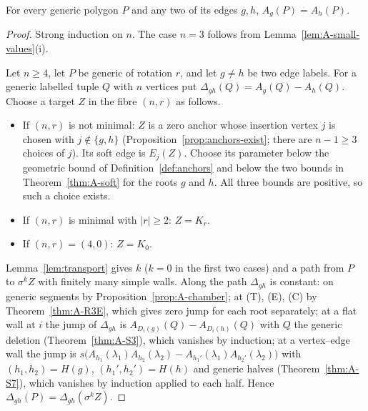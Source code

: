 \begin{theorem}\label{thm:root-indep-proof}\leanok
For every generic polygon $P$ and any two of its edges $g,h$, $A_g(P)=A_h(P)$.

\end{theorem}
\begin{proof}\leanok{}
Strong induction on $n$. The case $n=3$ follows from
Lemma~\ref{lem:A-small-values}(i).

Let $n\geq4$, let $P$ be generic of rotation $r$, and let $g\neq h$ be two
edge labels. For a generic labelled tuple $Q$ with $n$ vertices put
$\Delta_{gh}(Q)=A_g(Q)-A_h(Q)$. Choose a target $Z$ in the fibre $(n,r)$ as
follows.
\begin{itemize}
\item If $(n,r)$ is not minimal: $Z$ is a zero anchor whose insertion vertex
$j$ is chosen with $j\notin\{g,h\}$ (Proposition~\ref{prop:anchors-exist};
there are $n-1\geq3$ choices of $j$). Its soft edge is $E_j(Z)$.
Choose its parameter below the geometric bound of
Definition~\ref{def:anchors} and below the two bounds in
Theorem~\ref{thm:A-soft} for the roots $g$ and $h$.
All three bounds are positive, so such a choice exists.
\item If $(n,r)$ is minimal with $|r|\geq2$: $Z=K_r$.
\item If $(n,r)=(4,0)$: $Z=K_0$.
\end{itemize}
Lemma~\ref{lem:transport} gives $k$ ($k=0$ in the first two cases) and a path
from $P$ to $\sigma^kZ$ with finitely many simple walls. Along the path
$\Delta_{gh}$ is constant: on generic segments by
Proposition~\ref{prop:A-chamber}; at (T), (E), (C) by
Theorem~\ref{thm:A-R3E}, which gives zero jump for each root separately; at a
flat wall at $i$ the jump of $\Delta_{gh}$ is
$A_{D_i(g)}(Q)-A_{D_i(h)}(Q)$ with $Q$ the generic deletion
(Theorem~\ref{thm:A-S3}), which vanishes by induction; at a vertex--edge wall
the jump is
$s\bigl(A_{h_1}(\lambda_1)A_{h_2}(\lambda_2)-A_{h_1'}(\lambda_1)A_{h_2'}(\lambda_2)\bigr)$
with $(h_1,h_2)=H(g)$, $(h_1',h_2')=H(h)$ and generic halves
(Theorem~\ref{thm:A-S7}), which vanishes by induction applied to each half.
Hence $\Delta_{gh}(P)=\Delta_{gh}(\sigma^kZ)$.


\end{proof}
